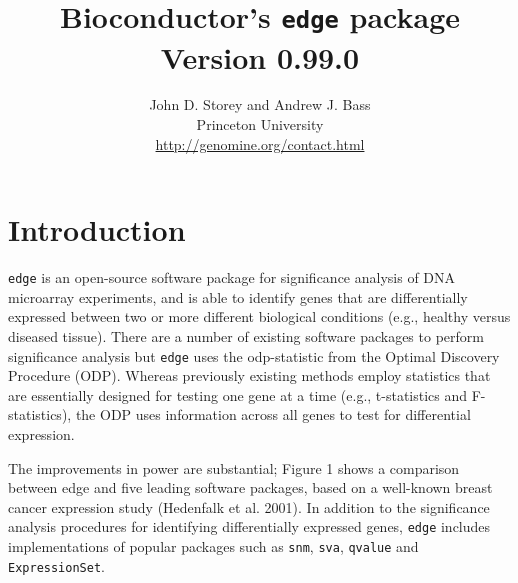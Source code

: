 \documentclass{article}\usepackage[]{graphicx}\usepackage[]{color}
\begin{document}
\title{Bioconductor's {\tt edge} package \\ Version 0.99.0}
\author{John D. Storey and Andrew J. Bass \\ Princeton University \\ \url{http://genomine.org/contact.html}}
\maketitle
\tableofcontents
\newpage
\section{Introduction}

{\tt edge} is an open-source software package for significance analysis of DNA microarray experiments, and is able  to identify genes that are differentially expressed between two or more different biological conditions (e.g., healthy versus diseased tissue). There are a number of existing software packages to perform significance analysis but {\tt edge} uses the odp-statistic from the Optimal Discovery Procedure (ODP). Whereas previously existing methods employ statistics that are essentially designed for testing one gene at a time (e.g., t-statistics and F-statistics), the ODP uses information across all genes to test for differential expression. 

The improvements in power are substantial; Figure 1 shows a comparison between edge and five leading software packages, based on a well-known breast cancer expression study (Hedenfalk et al. 2001). In addition to the significance analysis procedures for identifying differentially expressed genes, {\tt edge} includes implementations of popular packages such as {\tt snm}, {\tt sva}, {\tt qvalue} and {\tt ExpressionSet}. 
\end{document}

